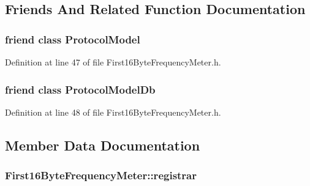 \subsection{Friends And Related Function Documentation}
\hypertarget{class_vsid_1_1_first16_byte_frequency_meter_a80219b863d4ff3456933d16bc5f73f45}{
\subsubsection[{Protocol\-Model}]{\setlength{\rightskip}{0pt plus 5cm}friend class {\bf Protocol\-Model}\hspace{0.3cm}{\ttfamily [friend]}}}\label{class_vsid_1_1_first16_byte_frequency_meter_a80219b863d4ff3456933d16bc5f73f45}


Definition at line 47 of file First16\-Byte\-Frequency\-Meter.\-h.

\hypertarget{class_vsid_1_1_first16_byte_frequency_meter_a3c0d389e7a9476b06313d8fb9ca9fe68}{
\subsubsection[{Protocol\-Model\-Db}]{\setlength{\rightskip}{0pt plus 5cm}friend class {\bf Protocol\-Model\-Db}\hspace{0.3cm}{\ttfamily [friend]}}}\label{class_vsid_1_1_first16_byte_frequency_meter_a3c0d389e7a9476b06313d8fb9ca9fe68}


Definition at line 48 of file First16\-Byte\-Frequency\-Meter.\-h.



\subsection{Member Data Documentation}
\hypertarget{class_vsid_1_1_first16_byte_frequency_meter_a4555c80e7dbbc6d23ff452bc1ca70df4}{
\subsubsection[{registrar}]{ First16\-Byte\-Frequency\-Meter\-::registrar\hspace{0.3cm}{\ttfamily [static]}}}\label{class_vsid_1_1_first16_byte_frequency_meter_a4555c80e7dbbc6d23ff452bc1ca70df4}


